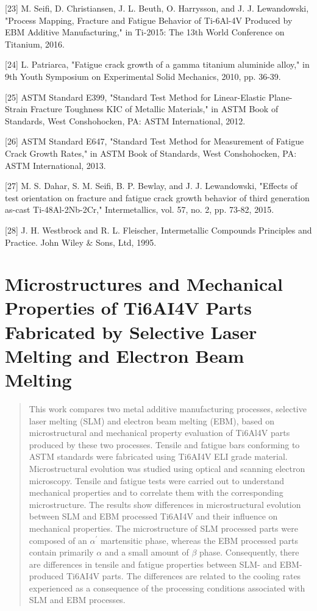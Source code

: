 \documentclass[10pt]{article}
\begin{document}
[23] M. Seifi, D. Christiansen, J. L. Beuth, O. Harrysson, and J. J. Lewandowski, "Process Mapping, Fracture and Fatigue Behavior of Ti-6Al-4V Produced by EBM Additive Manufacturing," in Ti-2015: The 13th World Conference on Titanium, 2016.

[24] L. Patriarca, "Fatigue crack growth of a gamma titanium aluminide alloy," in 9th Youth Symposium on Experimental Solid Mechanics, 2010, pp. 36-39.

[25] ASTM Standard E399, "Standard Test Method for Linear-Elastic Plane-Strain Fracture Toughness KIC of Metallic Materials," in ASTM Book of Standards, West Conshohocken, PA: ASTM International, 2012.

[26] ASTM Standard E647, "Standard Test Method for Measurement of Fatigue Crack Growth Rates," in ASTM Book of Standards, West Conshohocken, PA: ASTM International, 2013.

[27] M. S. Dahar, S. M. Seifi, B. P. Bewlay, and J. J. Lewandowski, "Effects of test orientation on fracture and fatigue crack growth behavior of third generation as-cast Ti-48Al-2Nb-2Cr," Intermetallics, vol. 57, no. 2, pp. 73-82, 2015.

[28] J. H. Westbrock and R. L. Fleischer, Intermetallic Compounds Principles and Practice. John Wiley \& Sons, Ltd, 1995.

\section*{Microstructures and Mechanical Properties of Ti6AI4V Parts Fabricated by Selective Laser Melting and Electron Beam Melting }


\begin{abstract}
This work compares two metal additive manufacturing processes, selective laser melting (SLM) and electron beam melting (EBM), based on microstructural and mechanical property evaluation of Ti6Al4V parts produced by these two processes. Tensile and fatigue bars conforming to ASTM standards were fabricated using Ti6AI4V ELI grade material. Microstructural evolution was studied using optical and scanning electron microscopy. Tensile and fatigue tests were carried out to understand mechanical properties and to correlate them with the corresponding microstructure. The results show differences in microstructural evolution between SLM and EBM processed Ti6AI4V and their influence on mechanical properties. The microstructure of SLM processed parts were composed of an $\alpha^{\prime}$ martensitic phase, whereas the EBM processed parts contain primarily $\alpha$ and a small amount of $\beta$ phase. Consequently, there are differences in tensile and fatigue properties between SLM- and EBM-produced Ti6AI4V parts. The differences are related to the cooling rates experienced as a consequence of the processing conditions associated with SLM and EBM processes.
\end{abstract}
\end{document}

